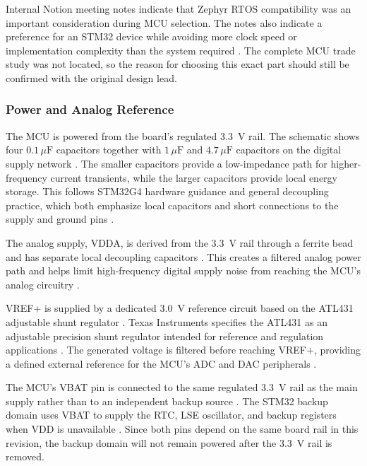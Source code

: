 \documentclass[10pt]{../datasheet}
\begin{document}
Internal Notion meeting notes indicate that Zephyr RTOS compatibility was an
important consideration during MCU selection. The notes also indicate a
preference for an STM32 device while avoiding more clock speed or implementation
complexity than the system required \cite{notion-meeting-notes}. The complete
MCU trade study was not located, so the reason for choosing this exact part
should still be confirmed with the original design lead.

\subsubsection{Power and Analog Reference}

The MCU is powered from the board's regulated 3.3~V rail. The schematic shows
four \(0.1\,\mu\mathrm{F}\) capacitors together with \(1\,\mu\mathrm{F}\)
and \(4.7\,\mu\mathrm{F}\) capacitors on the digital supply network
\cite{obc-schematic}. The smaller capacitors provide a low-impedance path for
higher-frequency current transients, while the larger capacitors provide local
energy storage. This follows STM32G4 hardware guidance and general decoupling
practice, which both emphasize local capacitors and short connections to the
supply and ground pins \cite{stm32g4-hardware,analog-devices-decoupling}.

The analog supply, VDDA, is derived from the 3.3~V rail through a ferrite bead
and has separate local decoupling capacitors \cite{obc-schematic}. This creates
a filtered analog power path and helps limit high-frequency digital supply noise
from reaching the MCU's analog circuitry
\cite{stm32g4-hardware,analog-devices-decoupling}.

VREF+ is supplied by a dedicated 3.0~V reference circuit based on the ATL431
adjustable shunt regulator \cite{obc-schematic}. Texas Instruments specifies
the ATL431 as an adjustable precision shunt regulator intended for reference
and regulation applications \cite{atl431-datasheet}. The generated voltage is
filtered before reaching VREF+, providing a defined external reference for the
MCU's ADC and DAC peripherals
\cite{stm32g431-datasheet,obc-schematic,atl431-datasheet}.

The MCU's VBAT pin is connected to the same regulated 3.3~V rail as the main
supply rather than to an independent backup source \cite{obc-schematic}. The
STM32 backup domain uses VBAT to supply the RTC, LSE oscillator, and backup
registers when VDD is unavailable \cite{stm32g431-datasheet}. Since both pins
depend on the same board rail in this revision, the backup domain will not
remain powered after the 3.3~V rail is removed.
\end{document}
